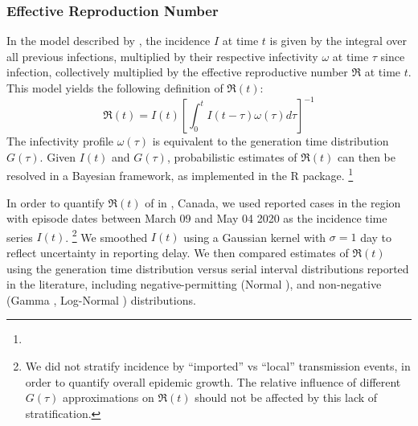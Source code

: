 \subsubsection{Effective Reproduction Number}
In the model described by \textcite{Cori2013},
the incidence $I$ at time $t$ is given by
the integral over all previous infections,
multiplied by their respective infectivity $\omega$
at time $\tau$ since infection,
collectively multiplied by the effective reproductive number
$\Re$ at time $t$.
This model yields the following definition of $\Re(t)$:
\begin{equation}
\Re(t) = I(t) {\left[\int_{0}^{t}{I(t-\tau) \omega(\tau) d\tau}\right]}^{-1}
\end{equation}
The infectivity profile $\omega(\tau)$ is equivalent to
the generation time distribution $G(\tau)$.
Given $I(t)$ and $G(\tau)$,
probabilistic estimates of $\Re(t)$
can then be resolved in a Bayesian framework,
as implemented in the  R package.%
\footnote{}
\par
In order to quantify $\Re(t)$ of \covid in \gta, Canada,
we used reported cases in the region
with episode dates between March 09 and May 04 2020
as the incidence time series $I(t)$.%
\footnote{We did not stratify incidence by
  ``imported'' vs ``local'' transmission events,
  in order to quantify overall epidemic growth.
  The relative influence of different $G(\tau)$ approximations on $\Re(t)$
  should not be affected by this lack of stratification.
}
We smoothed $I(t)$ using a Gaussian kernel with $\sigma = 1$ day
to reflect uncertainty in reporting delay.
We then compared estimates of $\Re(t)$ using
the \mle generation time distribution
versus serial interval distributions reported in the literature,
including negative-permitting (Normal \cite{Du2020}),
and non-negative (Gamma \cite{Zhang2020}, Log-Normal \cite{Nishiura2020})
distributions.